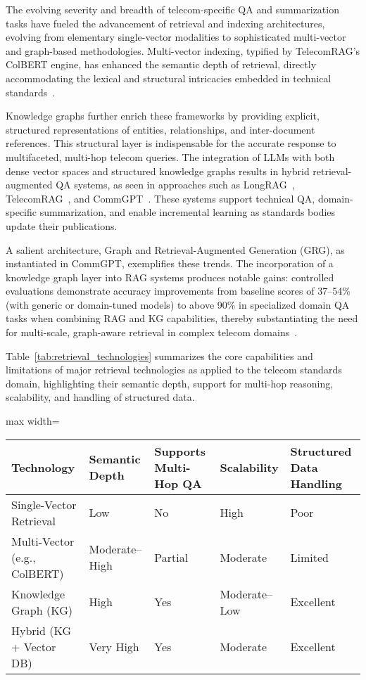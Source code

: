 \documentclass[sigconf]{acmart}
\begin{document}
The evolving severity and breadth of telecom-specific QA and summarization tasks have fueled the advancement of retrieval and indexing architectures, evolving from elementary single-vector modalities to sophisticated multi-vector and graph-based methodologies. Multi-vector indexing, typified by TelecomRAG's ColBERT engine, has enhanced the semantic depth of retrieval, directly accommodating the lexical and structural intricacies embedded in technical standards~\cite{ref20,ref21}.

Knowledge graphs further enrich these frameworks by providing explicit, structured representations of entities, relationships, and inter-document references. This structural layer is indispensable for the accurate response to multifaceted, multi-hop telecom queries. The integration of LLMs with both dense vector spaces and structured knowledge graphs results in hybrid retrieval-augmented QA systems, as seen in approaches such as LongRAG~\cite{ref16}, TelecomRAG~\cite{ref20}, and CommGPT~\cite{ref21}. These systems support technical QA, domain-specific summarization, and enable incremental learning as standards bodies update their publications.

A salient architecture, Graph and Retrieval-Augmented Generation (GRG), as instantiated in CommGPT, exemplifies these trends. The incorporation of a knowledge graph layer into RAG systems produces notable gains: controlled evaluations demonstrate accuracy improvements from baseline scores of 37--54\% (with generic or domain-tuned models) to above 90\% in specialized domain QA tasks when combining RAG and KG capabilities, thereby substantiating the need for multi-scale, graph-aware retrieval in complex telecom domains~\cite{ref21}.

Table~\ref{tab:retrieval_technologies} summarizes the core capabilities and limitations of major retrieval technologies as applied to the telecom standards domain, highlighting their semantic depth, support for multi-hop reasoning, scalability, and handling of structured data.

\begin{table*}[htbp]
\centering
\caption{Characteristics of Retrieval and Indexing Technologies for Telecom Standards QA}
\label{tab:retrieval_technologies}
\begin{adjustbox}{max width=\textwidth}
\begin{tabular}{lllll}
\toprule
\textbf{Technology} & \textbf{Semantic Depth} & \textbf{Supports Multi-Hop QA} & \textbf{Scalability} & \textbf{Structured Data Handling} \\
\midrule
Single-Vector Retrieval & Low & No & High & Poor \\
Multi-Vector (e.g., ColBERT) & Moderate--High & Partial & Moderate & Limited \\
Knowledge Graph (KG) & High & Yes & Moderate--Low & Excellent \\
Hybrid (KG + Vector DB) & Very High & Yes & Moderate & Excellent \\
\bottomrule
\end{tabular}
\end{adjustbox}
\end{table*}
\end{document}
